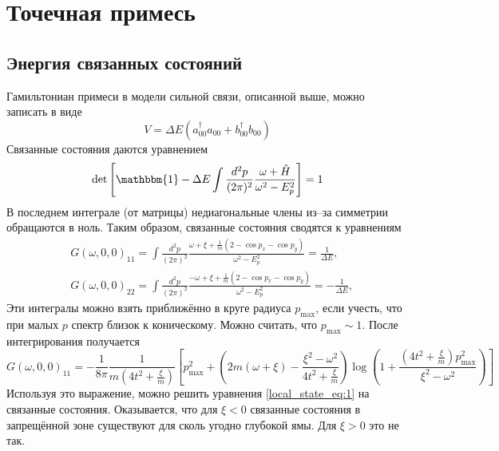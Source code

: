 \section{Точечная примесь}
\subsection{Энергия связанных состояний}
Гамильтониан примеси в модели сильной связи, описанной выше, можно записать в виде
\begin{equation}
    V = \Delta E (a_{00}^\dagger a_{00} + b_{00}^\dagger b_{00})
\end{equation}
Связанные состояния даются уравнением
\begin{equation}    
    \det{\left[\mathbbm{1} - \Delta E \int \frac{d^2 p}{(2\pi)^2} 
            \frac{\omega + \hat{H}}{\omega^2 - E_p^2}\right]} = 1
\end{equation}
В последнем интеграле (от матрицы) недиагональные члены из--за симметрии обращаются в ноль.
Таким образом, связанные состояния сводятся к уравнениям
\begin{align}
        &G(\omega,0,0)_{11} = \int \frac{d^2 p}{(2\pi)^2} 
            \frac{\omega + \xi + \frac{1}{m}(2 - \cos{p_x} - \cos{p_y})}
                 {\omega^2 - E_p^2} =\frac{1}{\Delta E}, \label{local_state_eq:1}\\
        &G(\omega,0,0)_{22} = \int \frac{d^2 p}{(2\pi)^2} 
            \frac{-\omega + \xi + \frac{1}{m}(2 - \cos{p_x} - \cos{p_y})}
                 {\omega^2 - E_p^2} =-\frac{1}{\Delta E}, \label{local_state_eq:2}
\end{align}
Эти интегралы можно взять приближённо в круге радиуса $p_{\mathrm{max}}$,
если учесть, что при малых $p$ спектр близок к 
коническому. Можно считать, что $p_{\mathrm{max}} \sim 1$. После интегрирования получается
\begin{equation}
    \label{approx_green_func}
    G(\omega,0,0)_{11} = -\frac{1}{8\pi}\frac{1}{m(4t^2 + \frac{\xi}{m})}
        \left[ p_{\mathrm{max}}^2 + 
            \left(2m(\omega+\xi) - \frac{\xi^2 - \omega^2}{4t^2 + \frac{\xi}{m}}\right) 
                \log{\left(1 + \frac{\left(4t^2 + \frac{\xi}{m}\right)p_{\mathrm{max}}^2}
                                    {\xi^2 - \omega^2}\right)}\right]
\end{equation}
Используя это выражение, можно решить уравнения \eqref{local_state_eq:1} 
на связанные состояния. Оказывается, 
что для $\xi < 0$ связанные состояния в запрещённой зоне существуют для сколь угодно 
глубокой ямы. Для $\xi > 0$ это не так.

